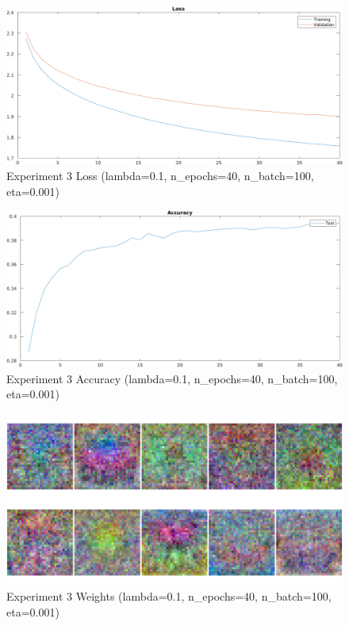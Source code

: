     \begin{figure}[ht]
        \includegraphics[width=\textwidth]{../code/result_pics/lambda=.1, n_epochs=40, n_batch=100, eta=.001/loss.png}
        \caption{Experiment 3 Loss (lambda=0.1, n\_epochs=40, n\_batch=100, eta=0.001)}
        \label{fig:loss3}
    \end{figure}

    \begin{figure}[ht]
        \includegraphics[width=\textwidth]{../code/result_pics/lambda=.1, n_epochs=40, n_batch=100, eta=.001/accuracy.png}
        \caption{Experiment 3 Accuracy (lambda=0.1, n\_epochs=40, n\_batch=100, eta=0.001)}
        \label{fig:accuracy3}
    \end{figure}

    \begin{figure}[ht]
        \includegraphics[width=\textwidth]{../code/result_pics/lambda=.1, n_epochs=40, n_batch=100, eta=.001/weights.png}
        \caption{Experiment 3 Weights (lambda=0.1, n\_epochs=40, n\_batch=100, eta=0.001)}
        \label{fig:weights3}
    \end{figure}

